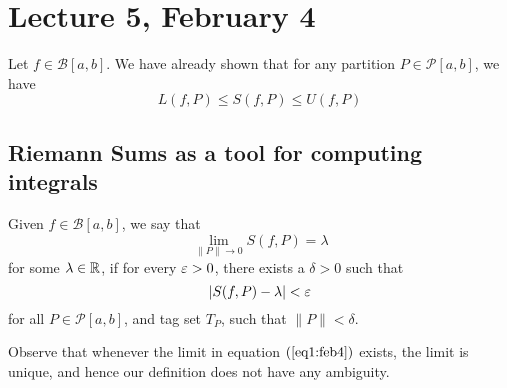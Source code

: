 \chapter*{Lecture 5, February 4}
\setcounter{chapter}{5}
\setcounter{section}{0}

Let $f \in \mathcal{B}[a,b]$. We have already shown that for any partition $P \in \mathcal{P}[a,b]$, we have 
\begin{equation}\label{eq:LSU}
    L(f,P) \leq S(f,P) \leq U(f,P) 
\end{equation}

\section{Riemann Sums as a tool for computing integrals}

\begin{defn}
    Given $f \in \mathcal{B}[a,b]$, we say that 
    \begin{equation}\label{eq1:feb4}
        \lim_{\|P\|\to 0} S(f,P) = \lambda 
    \end{equation}
    for some $\lambda \in \mathbb{R}$, if for every $\varepsilon > 0$, there exists a $\delta > 0$ such that 
    \[ |S(f,P) - \lambda| < \varepsilon \]
    for all $P \in \mathcal{P}[a,b]$, and tag set $T_P$, such that $\|P\| < \delta$.
\end{defn}

Observe that whenever the limit in equation $(\ref{eq1:feb4})$ exists, the limit is unique, and hence our definition does not have any ambiguity. 

